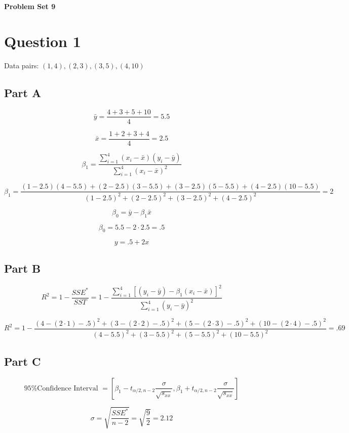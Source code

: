 \documentclass[letterpaper]{article}
\begin{document}
\vspace*{6pt}

\noindent \textbf{\huge{Problem Set 9}}

\bigskip

\section*{Question 1}

Data pairs: $(1,4), (2,3), (3,5), (4,10)$

\subsection*{Part A}

$$\bar{y} = \frac{4 + 3 + 5 + 10}{4} = 5.5$$

$$\bar{x} = \frac{1 + 2 + 3 + 4}{4} = 2.5$$

$$\beta_1 = \frac{\sum_{i=1}^4 (x_i - \bar{x}) (y_i - \bar{y})}{\sum_{i=1}^4 (x_i - \bar{x})^2}$$

$$\beta_1 = \frac{(1-2.5)(4-5.5) + (2-2.5)(3-5.5) + (3-2.5)(5-5.5) + (4-2.5)(10-5.5)}{(1-2.5)^2 + (2-2.5)^2 + (3-2.5)^2 + (4-2.5)^2} = 2$$

$$\beta_0 = \bar{y} - \beta_1 \bar{x}$$

$$\beta_0 = 5.5 - 2 \cdot 2.5 = .5$$

$$y = .5 + 2x$$

\subsection*{Part B}

$$R^2 = 1 - \frac{SSE^*}{SST} = 1 - \frac{\sum_{i=1}^4 [(y_i - \bar{y}) - \beta_1 (x_i - \bar{x})]^2}{\sum_{i=1}^4 (y_i - \bar{y})^2}$$

$$R^2 = 1 - \frac{(4 - (2 \cdot 1) -.5)^2 + (3 - (2 \cdot 2) -.5)^2 + (5 - (2 \cdot 3) -.5)^2 + (10 - (2 \cdot 4) -.5)^2}{(4-5.5)^2 + (3-5.5)^2 + (5-5.5)^2 + (10-5.5)^2} = .69$$

\subsection*{Part C}

$$\text{95\% Confidence Interval } = [\beta_1 - t_{\alpha/2, n-2} \frac{\sigma}{\sqrt{s_{xx}}}, \beta_1 + t_{\alpha/2, n-2} \frac{\sigma}{\sqrt{s_{xx}}}]$$

$$\sigma = \sqrt{\frac{SSE^*}{n-2}} = \sqrt{\frac{9}{2}} = 2.12$$
\end{document}
